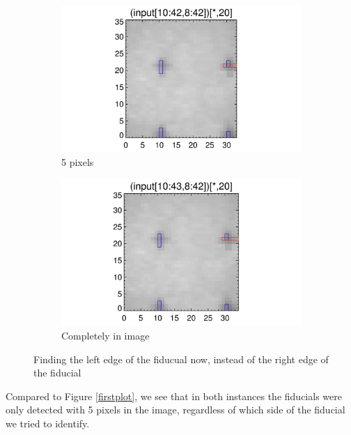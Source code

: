 \documentclass[10pt]{article}
\begin{document}
\begin{figure}[!h]
    \begin{subfigure}[b]{.45\linewidth}
        \centering
        \includegraphics[width=1.3\textwidth]{../plots_tables_images/fidcheck_newdegree4.png}
        \caption{5 pixels}
    \end{subfigure}
    \begin{subfigure}[b]{.45\linewidth}
        \centering
        \includegraphics[width=1.3\textwidth]{../plots_tables_images/fidcheck_newdegree5.png}
        \caption{Completely in image}
    \end{subfigure}
    \caption{Finding the left edge of the fiducual now, instead of the right edge of the fiducial}
    \label{isitok}
\end{figure}

Compared to Figure \ref{firstplot}, we see that in both instances the fiducials were only detected with 5 pixels in the image, regardless of which side of the fiducial we tried to identify.



\end{document}
